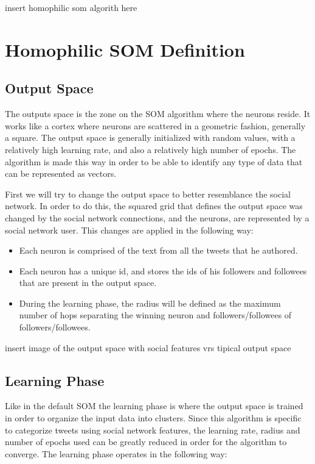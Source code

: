 {\color{red} insert homophilic som algorith here}

\section{Homophilic SOM Definition}
\label{sec:algorithm_changes}

\subsection{Output Space}
\label{sub:output_space}
The outputs space is the zone on the \ac{SOM} algorithm where the neurons reside. It works like a cortex where neurons are scattered in a geometric fashion, generally a square. The output space is generally initialized with random values, with a relatively high learning rate, and also a relatively high number of epochs. The algorithm is made this way in order to be able to identify any type of data that can be represented as vectors.

First we will try to change the output space to better resemblance the social network. In order to do this, the squared grid that defines the output space was changed by the social network connections, and the neurons, are represented by a social network user. This changes are applied in the following way:
\begin{itemize}
  \item Each neuron is comprised of the text from all the tweets that he authored.
  \item Each neuron has a unique id, and stores the ids of his followers and followees that are present in the output space.
  \item During the learning phase, the radius will be defined as the maximum number of hops separating the winning neuron and followers/followees of followers/followees. 
\end{itemize}

{\color{red} insert image of the output space with social features vrs tipical output space}

\subsection{Learning Phase}
\label{sub:learning_phase}
Like in the default \ac{SOM} the learning phase is where the output space is trained in order to organize the input data into clusters. Since this algorithm is specific to categorize tweets using social network features, the learning rate, radius and number of epochs used can be greatly reduced in order for the algorithm to converge. The learning phase operates in the following way:

